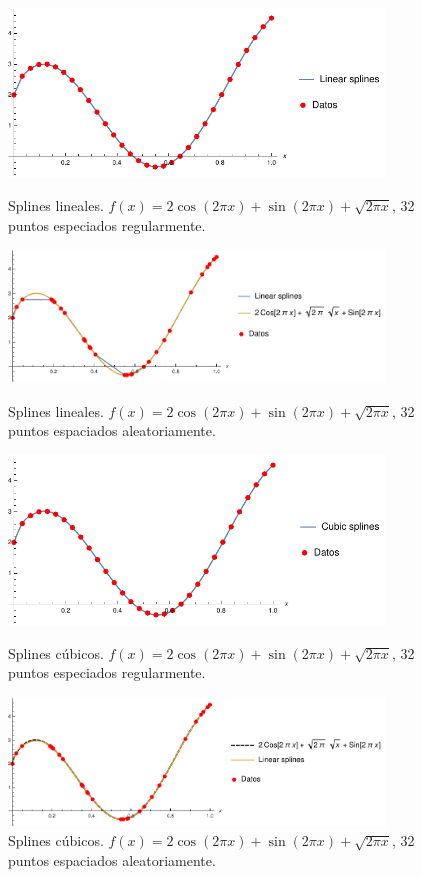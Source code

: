 \documentclass[11pt,letterpaper]{article}
\begin{document}
\begin{figure}
\centering
\includegraphics[width=10cm]{img/29.pdf}
\caption{Splines lineales. $f(x)=2\cos (2\pi x)+\sin (2\pi x)+\sqrt{2\pi x}$, 32 puntos especiados regularmente.}
\includegraphics[width=10cm]{img/30.pdf}
\caption{Splines lineales. $f(x)=2\cos (2\pi x)+\sin (2\pi x)+\sqrt{2\pi x}$, 32 puntos espaciados aleatoriamente.}
\includegraphics[width=10cm]{img/31.pdf}
\caption{Splines cúbicos. $f(x)=2\cos (2\pi x)+\sin (2\pi x)+\sqrt{2\pi x}$, 32 puntos especiados regularmente.}
\includegraphics[width=10cm]{img/32.pdf}
\caption{Splines cúbicos. $f(x)=2\cos (2\pi x)+\sin (2\pi x)+\sqrt{2\pi x}$, 32 puntos espaciados aleatoriamente.}
\end{figure}
\end{document}
